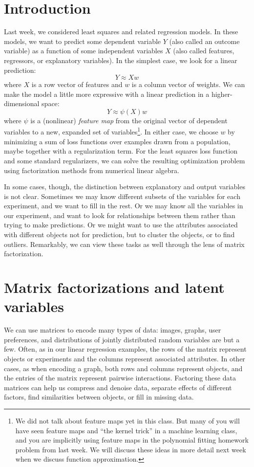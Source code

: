 \documentclass[12pt, leqno]{article} %
\begin{document}

\section{Introduction}

Last week, we considered least squares and related regression models.
In these models, we want to predict some dependent variable $Y$ (also
called an outcome variable) as a function of some independent
variables $X$ (also called features, regressors, or explanatory
variables).  In the simplest case, we look for a linear prediction:
\[
  Y \approx Xw
\]
where $X$ is a row vector of features and $w$ is a column vector of
weights.  We can make the model a little more expressive with a linear
prediction in a higher-dimensional space:
\[
  Y \approx \psi(X) w
\]
where $\psi$ is a (nonlinear) {\em feature map} from the original vector of
dependent variables to a new, expanded set of variables\footnote{%
  We did not talk about feature maps yet in this class.  But many
  of you will have seen feature maps and ``the kernel trick'' in
  a machine learning class, and you are implicitly using feature maps
  in the polynomial fitting homework problem from last week.  We will
  discuss these ideas in more detail next week when we discuss
  function approximation.
}.
In either case, we choose $w$ by minimizing a sum of loss functions
over examples drawn from a population, maybe together with a
regularization term.  For the least squares loss function and
some standard regularizers, we can solve the resulting optimization
problem using factorization methods from numerical linear algebra.

In some cases, though, the distinction between explanatory and output
variables is not clear.  Sometimes we may know different subsets of
the variables for each experiment, and we want to fill in the rest.
Or we may know all the variables in our experiment, and want
to look for relationships between them rather than trying to make
predictions.  Or we might want to use the attributes associated
with different objects not for prediction, but to cluster the objects,
or to find outliers.  Remarkably, we can view these tasks as well
through the lens of matrix factorization.

\section{Matrix factorizations and latent variables}

We can use matrices to encode many types of data: images, graphs, user
preferences, and distributions of jointly distributed random variables
are but a few.  Often, as in our linear regression examples, the rows
of the matrix represent objects or experiments and the columns
represent associated attributes.  In other cases, as when encoding a
graph, both rows and columns represent objects, and the entries of the
matrix represent pairwise interactions.  Factoring these data matrices
can help us compress and denoise data, separate effects of different
factors, find similarities between objects, or fill in missing data.
\end{document}
